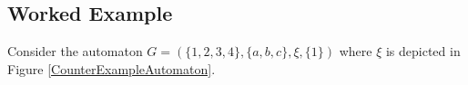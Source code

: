 \documentclass{article}
\begin{document}
				\begin{comment}
				\begin{enumerate}
					\item let $COM$ be equal to $TR(G,\Sigma_{uo})$.
					\item $\forall M \in BAD $ 
					\begin{enumerate}
						\item $\forall x \in M$
						\begin{enumerate}
							\item build $S_x$ by following all paths entering $x$.
						\end{enumerate}
						\item Remove $\bigcap_{x\in M} S_x$ from each $S_x$ for $x\in M$
					\end{enumerate}
					\item $\forall \sigma \in TR(G,\Sigma_{uo})$
					\begin{enumerate}
						\item Remove $\sigma$ from all $s \in S_x$ for each $S_x$
						\item Compare all $s$ in each $S_x$.
						\begin{enumerate}
							\item If $\bigcap_{x\in M} S_x = \emptyset$ delete $\sigma$ from $COM$.
							\item Else do nothing.
						\end{enumerate}
					\end{enumerate}
					\item return COM.
				\end{enumerate}
				\end{comment}


		\subsection{Worked Example}

			Consider the automaton $G = (\{1, 2, 3, 4\}, \{a, b, c\}, \xi, \{1\})$ where $\xi$ is depicted in Figure \ref{CounterExampleAutomaton}.
\end{document}
